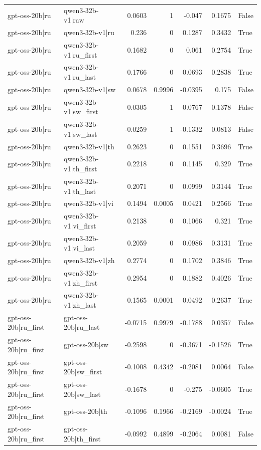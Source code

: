 \begin{table}
\begin{tabular}{l l r r r r l}
gpt-oss-20b|ru & qwen3-32b-v1|raw & 0.0603 & 1 & -0.047 & 0.1675 & False \\
gpt-oss-20b|ru & qwen3-32b-v1|ru & 0.236 & 0 & 0.1287 & 0.3432 & True \\
gpt-oss-20b|ru & qwen3-32b-v1|ru_first & 0.1682 & 0 & 0.061 & 0.2754 & True \\
gpt-oss-20b|ru & qwen3-32b-v1|ru_last & 0.1766 & 0 & 0.0693 & 0.2838 & True \\
gpt-oss-20b|ru & qwen3-32b-v1|sw & 0.0678 & 0.9996 & -0.0395 & 0.175 & False \\
gpt-oss-20b|ru & qwen3-32b-v1|sw_first & 0.0305 & 1 & -0.0767 & 0.1378 & False \\
gpt-oss-20b|ru & qwen3-32b-v1|sw_last & -0.0259 & 1 & -0.1332 & 0.0813 & False \\
gpt-oss-20b|ru & qwen3-32b-v1|th & 0.2623 & 0 & 0.1551 & 0.3696 & True \\
gpt-oss-20b|ru & qwen3-32b-v1|th_first & 0.2218 & 0 & 0.1145 & 0.329 & True \\
gpt-oss-20b|ru & qwen3-32b-v1|th_last & 0.2071 & 0 & 0.0999 & 0.3144 & True \\
gpt-oss-20b|ru & qwen3-32b-v1|vi & 0.1494 & 0.0005 & 0.0421 & 0.2566 & True \\
gpt-oss-20b|ru & qwen3-32b-v1|vi_first & 0.2138 & 0 & 0.1066 & 0.321 & True \\
gpt-oss-20b|ru & qwen3-32b-v1|vi_last & 0.2059 & 0 & 0.0986 & 0.3131 & True \\
gpt-oss-20b|ru & qwen3-32b-v1|zh & 0.2774 & 0 & 0.1702 & 0.3846 & True \\
gpt-oss-20b|ru & qwen3-32b-v1|zh_first & 0.2954 & 0 & 0.1882 & 0.4026 & True \\
gpt-oss-20b|ru & qwen3-32b-v1|zh_last & 0.1565 & 0.0001 & 0.0492 & 0.2637 & True \\
gpt-oss-20b|ru_first & gpt-oss-20b|ru_last & -0.0715 & 0.9979 & -0.1788 & 0.0357 & False \\
gpt-oss-20b|ru_first & gpt-oss-20b|sw & -0.2598 & 0 & -0.3671 & -0.1526 & True \\
gpt-oss-20b|ru_first & gpt-oss-20b|sw_first & -0.1008 & 0.4342 & -0.2081 & 0.0064 & False \\
gpt-oss-20b|ru_first & gpt-oss-20b|sw_last & -0.1678 & 0 & -0.275 & -0.0605 & True \\
gpt-oss-20b|ru_first & gpt-oss-20b|th & -0.1096 & 0.1966 & -0.2169 & -0.0024 & True \\
gpt-oss-20b|ru_first & gpt-oss-20b|th_first & -0.0992 & 0.4899 & -0.2064 & 0.0081 & False \\

\end{tabular}
\end{table}
